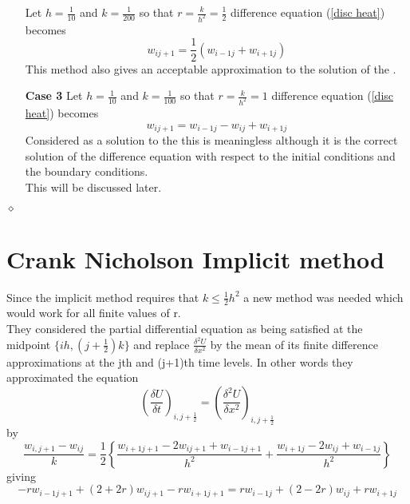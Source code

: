 \begin{example}
\begin{enumerate}
Let $h=\frac{1}{10}$ and $k=\frac{1}{200}$ so that $r=\frac{k}{h^2}=\frac{1}{2}$
difference equation (\ref{disc heat}) becomes
\[
w_{ij+1}=\frac{1}{2}(w_{i-1j}+w_{i+1j})
\]
This method also gives an acceptable approximation to the solution of the .
\item[\textbf{Case 3}]
Let $h=\frac{1}{10}$ and $k=\frac{1}{100}$ so that $r=\frac{k}{h^2}=1$
difference equation (\ref{disc heat}) becomes
\[
w_{ij+1}=w_{i-1j}-w_{ij}+w_{i+1j}
\]
Considered as a solution to the  this is meaningless although it is the correct
solution of the difference equation with respect to the initial conditions and the boundary conditions.\\
This will be discussed later.

\end{enumerate}
$\diamond$
\end{example}
\section{Crank Nicholson Implicit method}
Since the implicit method requires that $k\leq \frac{1}{2}h^2$ a new method was
needed which would work for all finite values of r.\\
They considered the partial differential equation as being satisfied at the
midpoint $\{ih,(j+\frac{1}{2})k \}$ and replace $\frac{\delta^2 U}{\delta x^2}$ by the
mean of its finite difference approximations at the jth and (j+1)th time levels.
In other words they approximated the equation
\[ \left(\frac{\delta U}{\delta t}\right)_{i,j+\frac{1}{2}}
= 
 \left(\frac{\delta^2 U}{\delta x^2}\right)_{i,j+\frac{1}{2}}\]
by
\[\frac{w_{i,j+1}-w_{ij}}{k}=\frac{1}{2}\left\{\frac{w_{i+1j+1}-2w_{ij+1}+w_{i-1j+1}}{h^2}+
\frac{w_{i+1j}-2w_{ij}+w_{i-1j}}{h^2}
\right\}
\]
giving
\begin{equation}
\label{2 crank}
-rw_{i-1j+1}+(2+2r)w_{ij+1}-rw_{i+1j+1}
=
rw_{i-1j}+(2-2r)w_{ij}+rw_{i+1j}
\end{equation}

